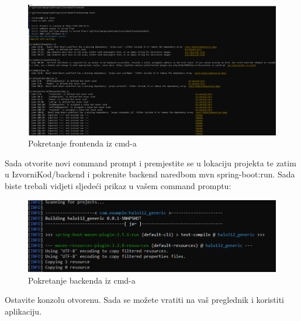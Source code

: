 				\begin{figure}[H]
					\includegraphics[scale=0.3]{slike/pokretanje_frontenda.png}
					\centering
					\caption{Pokretanje frontenda iz cmd-a}
					\label{fig:test3}
				\end{figure}
			
			Sada otvorite novi command prompt i premjestite se u lokaciju projekta te zatim u IzvorniKod/backend i pokrenite backend naredbom mvn spring-boot:run. Sada biste trebali vidjeti sljedeći prikaz u vašem command promptu:
			
				\begin{figure}[H]
					\includegraphics[scale=0.8]{slike/pokretanje_backenda.png}
					\centering
					\caption{Pokretanje backenda iz cmd-a}
					\label{fig:test2}
				\end{figure}
			
			Ostavite konzolu otvorenu. Sada se možete vratiti na vaš preglednik i koristiti aplikaciju.
			
			\eject 